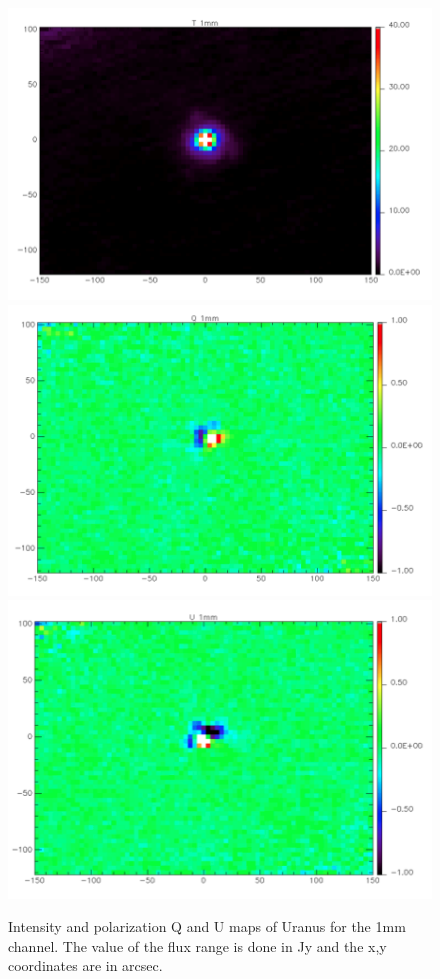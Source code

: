 \documentclass[12pt,a4]{article}
\begin{document}
 \begin{figure} [t!]

\includegraphics[scale=0.3]{figures/map_1mm_Uranus.png}
\includegraphics[scale=0.3]{figures/map_q_1mm_Uranus.png}
\includegraphics[scale=0.3]{figures/map_u_1mm_Uranus.png}
\caption{Intensity and polarization Q and U maps of Uranus for the 1mm channel.
 The value of the flux range is done in Jy and the x,y coordinates are in arcsec.}
\label{fig:Uranus_1mm}

  \end{figure}
\end{document}

